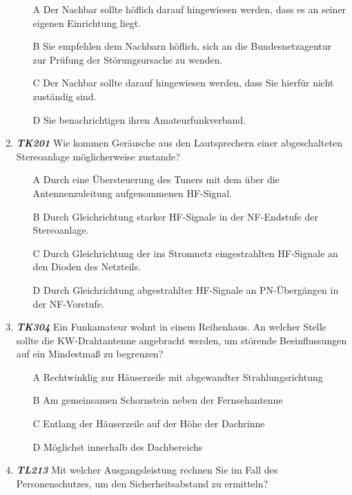 \begin{enumerate}
\begin{enumerate}
	\itemsep1pt\parskip0pt
		\item[A] Der Nachbar sollte höflich darauf hingewiesen werden, dass es an seiner eigenen Einrichtung liegt.
		\item[B] Sie empfehlen dem Nachbarn höflich, sich an die Bundesnetzagentur zur Prüfung der Störungsursache zu wenden.
		\item[C] Der Nachbar sollte darauf hingewiesen werden, dass Sie hierfür nicht zuständig sind.
		\item[D] Sie benachrichtigen ihren Amateurfunkverband.
		\end{enumerate}
	\item \emph{\textbf{TK201}}  Wie kommen Geräusche aus den Lautsprechern einer abgeschalteten Stereoanlage möglicherweise zustande?
	\begin{enumerate}
	\itemsep1pt\parskip0pt
		\item[A] Durch eine Übersteuerung des Tuners mit dem über die Antennenzuleitung aufgenommenen HF-Signal.
		\item[B] Durch Gleichrichtung starker HF-Signale in der NF-Endstufe der Stereoanlage.
		\item[C]  Durch Gleichrichtung der ins Stromnetz eingestrahlten HF-Signale an den Dioden des Netzteils.
		\item[D] Durch Gleichrichtung abgestrahlter HF-Signale an PN-Übergängen in der NF-Vorstufe.
		\end{enumerate}
	\item \emph{\textbf{TK304}} Ein Funkamateur wohnt in einem Reihenhaus. An welcher Stelle sollte die KW-Drahtantenne angebracht werden, um störende Beeinflussungen auf ein Mindestmaß zu begrenzen?
	\begin{enumerate}
	\itemsep1pt\parskip0pt
		\item[A] Rechtwinklig zur Häuserzeile mit abgewandter Strahlungsrichtung
		\item[B] Am gemeinsamen Schornstein neben der Fernsehantenne
		\item[C]  Entlang der Häuserzeile auf der Höhe der Dachrinne
		\item[D]  Möglichst innerhalb des Dachbereichs
		\end{enumerate}	
	\item \emph{\textbf{TL213}}  Mit welcher Ausgangsleistung rechnen Sie im Fall des Personenschutzes, um den Sicherheitsabstand zu ermitteln?
	\begin{enumerate}

\end{enumerate}
\end{enumerate}
